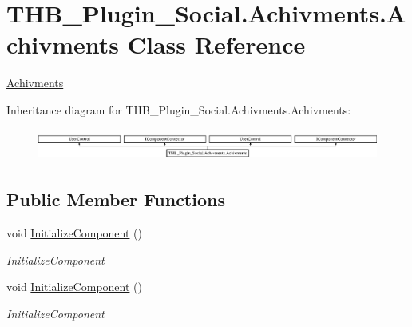 \hypertarget{class_t_h_b___plugin___social_1_1_achivments_1_1_achivments}{}\section{T\+H\+B\+\_\+\+Plugin\+\_\+\+Social.\+Achivments.\+Achivments Class Reference}
\label{class_t_h_b___plugin___social_1_1_achivments_1_1_achivments}


\mbox{\hyperlink{class_t_h_b___plugin___social_1_1_achivments_1_1_achivments}{Achivments}}  


Inheritance diagram for T\+H\+B\+\_\+\+Plugin\+\_\+\+Social.\+Achivments.\+Achivments\+:\begin{figure}[H]
\begin{center}
\leavevmode
\includegraphics[height=1.052632cm]{d8/dcc/class_t_h_b___plugin___social_1_1_achivments_1_1_achivments}
\end{center}
\end{figure}
\subsection*{Public Member Functions}
\begin{DoxyCompactItemize}
\item 
void \mbox{\hyperlink{class_t_h_b___plugin___social_1_1_achivments_1_1_achivments_a6f673611ddba423db8bacc8dbdff7a00}{Initialize\+Component}} ()
\begin{DoxyCompactList}\small\item\em Initialize\+Component \end{DoxyCompactList}\item 
void \mbox{\hyperlink{class_t_h_b___plugin___social_1_1_achivments_1_1_achivments_a6f673611ddba423db8bacc8dbdff7a00}{Initialize\+Component}} ()
\begin{DoxyCompactList}\small\item\em Initialize\+Component \end{DoxyCompactList}\end{DoxyCompactItemize}
